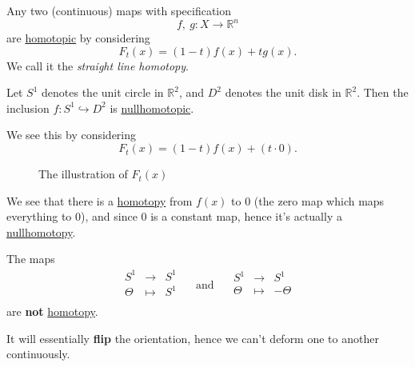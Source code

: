 \begin{eg}\label{eg:lec1:straight-line-homotopy}
	Any two (continuous) maps with specification
	\[
		f,\ g\colon X\to \mathbb{R}^n
	\]
	are \hyperref[def:homotopic]{homotopic} by considering
	\[
		F_{t}(x) = (1 - t)f(x) + t g(x).
	\]
	We call it the \emph{straight line homotopy}.
\end{eg}
\begin{eg}
	Let \(S^1\) denotes the unit circle in \(\mathbb{R} ^2\), and
	\(D^2\)  denotes the unit disk in \(\mathbb{R} ^2\). Then the inclusion
	\(f\colon S^1\hookrightarrow D^2\) is \hyperref[def:nullhomotopic]{nullhomotopic}.
\end{eg}
\begin{explanation}
	We see this by considering
	\[
		F_t(x) = (1 - t)f(x) + (t\cdot 0).
	\]
	\begin{figure}[H]
		\centering
		\caption{The illustration of \(F_{t}(x)\)}
		\label{fig:eg:homotopy}
	\end{figure}
	We see that there is a \hyperref[def:homotopy]{homotopy} from \(f(x)\) to \(0\) (the zero
	map which maps everything to \(0\)), and since \(0\) is a constant map, hence it's actually
	a \hyperref[def:nullhomotopic]{nullhomotopy}.
\end{explanation}
\begin{eg}
	The maps
	\[
		\begin{array}{ccc}
			S^1    & \to     & S^1 \\
			\Theta & \mapsto & S^1 \\
		\end{array}\quad \text{ and } \quad
		\begin{array}{ccc}
			S^1    & \to     & S^1     \\
			\Theta & \mapsto & -\Theta \\
		\end{array}
	\]
	are \textbf{not} \hyperref[def:homotopy]{homotopy}.
	\begin{remark}
		It will essentially \textbf{flip} the orientation, hence we can't deform one to another continuously.
	\end{remark}
\end{eg}

